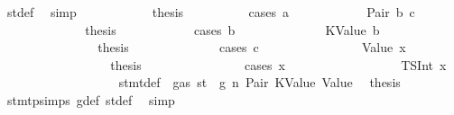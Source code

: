\begin{isabellebody}
\ st{\isacharprime}{\kern0pt}{\isacharunderscore}{\kern0pt}def\ \isamarkupfalse%
\ simp\isanewline
\ \ \ \ \ \ \ \ \isamarkupfalse%
\ \isamarkupfalse%
\ {\isacharquery}{\kern0pt}thesis\isanewline
\ \ \ \ \ \ \ \ \isamarkupfalse%
\ {\isacharparenleft}{\kern0pt}cases\ a{\isacharparenright}{\kern0pt}\isanewline
\ \ \ \ \ \ \ \ \ \ \isamarkupfalse%
\ {\isacharparenleft}{\kern0pt}Pair\ b\ c{\isacharparenright}{\kern0pt}\isanewline
\ \ \ \ \ \ \ \ \ \ \isamarkupfalse%
\ \isamarkupfalse%
\ {\isacharquery}{\kern0pt}thesis\isanewline
\ \ \ \ \ \ \ \ \ \ \isamarkupfalse%
\ {\isacharparenleft}{\kern0pt}cases\ b{\isacharparenright}{\kern0pt}\isanewline
\ \ \ \ \ \ \ \ \ \ \ \ \isamarkupfalse%
\ {\isacharparenleft}{\kern0pt}KValue\ b{\isacharparenright}{\kern0pt}\isanewline
\ \ \ \ \ \ \ \ \ \ \ \ \isamarkupfalse%
\ \isamarkupfalse%
\ {\isacharquery}{\kern0pt}thesis\isanewline
\ \ \ \ \ \ \ \ \ \ \ \ \isamarkupfalse%
\ {\isacharparenleft}{\kern0pt}cases\ c{\isacharparenright}{\kern0pt}\isanewline
\ \ \ \ \ \ \ \ \ \ \ \ \ \ \isamarkupfalse%
\ {\isacharparenleft}{\kern0pt}Value\ x{}{\isacharparenright}{\kern0pt}\isanewline
\ \ \ \ \ \ \ \ \ \ \ \ \ \ \isamarkupfalse%
\ \isamarkupfalse%
\ {\isacharquery}{\kern0pt}thesis\isanewline
\ \ \ \ \ \ \ \ \ \ \ \ \ \ \isamarkupfalse%
\ {\isacharparenleft}{\kern0pt}cases\ x{}{\isacharparenright}{\kern0pt}\isanewline
\ \ \ \ \ \ \ \ \ \ \ \ \ \ \ \ \isamarkupfalse%
\ {\isacharparenleft}{\kern0pt}TSInt\ x{}{\isacharparenright}{\kern0pt}\isanewline
\ \ \ \ \ \ \ \ \ \ \ \ \ \ \ \ \isamarkupfalse%
\ {}{\isacharparenleft}{\kern0pt}{}{\isacharparenright}{\kern0pt}\ stmt{\isacharunderscore}{\kern0pt}def\ {\isacharbackquoteopen}{\isasymnot}\ gas\ st\ {\isasymle}\ g{\isacharbackquoteclose}\ n\ Pair\ KValue\ Value\ \isamarkupfalse%
\ {\isacharquery}{\kern0pt}thesis\ \isamarkupfalse%
\ stmt{\isachardot}{\kern0pt}psimps{\isacharparenleft}{\kern0pt}{}{\isacharparenright}{\kern0pt}\ g{\isacharunderscore}{\kern0pt}def\ st{\isacharprime}{\kern0pt}{\isacharunderscore}{\kern0pt}def\ \isamarkupfalse%
\ simp\isanewline
\ \ \ \ \ \ \ \ \ \ \ \ \ \ \isamarkupfalse%
\isanewline
\ \ \ \ \ \ \ \ \ \ \ \ \ \ \ \ \isamarkupfalse%

\end{isabellebody}
